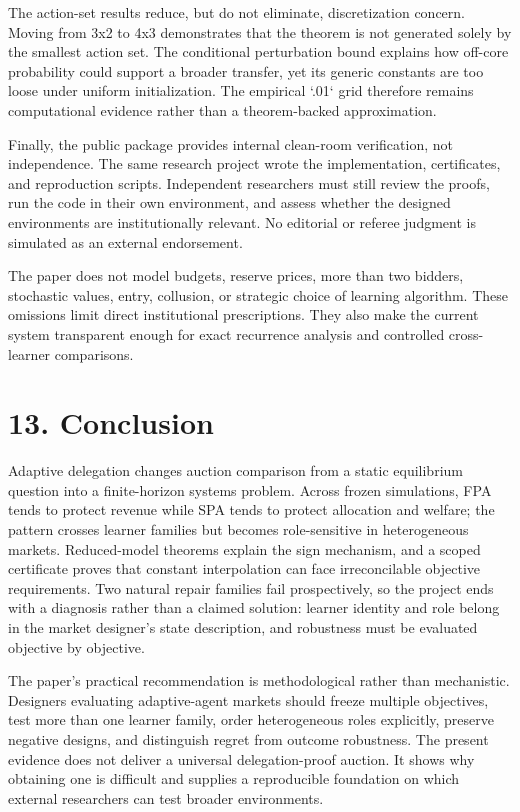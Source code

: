 \documentclass[11pt]{article}
\begin{document}
The action-set results reduce, but do not eliminate, discretization concern. Moving from 3x2 to 4x3 demonstrates that the theorem is not generated solely by the smallest action set. The conditional perturbation bound explains how off-core probability could support a broader transfer, yet its generic constants are too loose under uniform initialization. The empirical `.01` grid therefore remains computational evidence rather than a theorem-backed approximation.

Finally, the public package provides internal clean-room verification, not independence. The same research project wrote the implementation, certificates, and reproduction scripts. Independent researchers must still review the proofs, run the code in their own environment, and assess whether the designed environments are institutionally relevant. No editorial or referee judgment is simulated as an external endorsement.

The paper does not model budgets, reserve prices, more than two bidders, stochastic values, entry, collusion, or strategic choice of learning algorithm. These omissions limit direct institutional prescriptions. They also make the current system transparent enough for exact recurrence analysis and controlled cross-learner comparisons.

\section{13. Conclusion}
Adaptive delegation changes auction comparison from a static equilibrium question into a finite-horizon systems problem. Across frozen simulations, FPA tends to protect revenue while SPA tends to protect allocation and welfare; the pattern crosses learner families but becomes role-sensitive in heterogeneous markets. Reduced-model theorems explain the sign mechanism, and a scoped certificate proves that constant interpolation can face irreconcilable objective requirements. Two natural repair families fail prospectively, so the project ends with a diagnosis rather than a claimed solution: learner identity and role belong in the market designer's state description, and robustness must be evaluated objective by objective.

The paper's practical recommendation is methodological rather than mechanistic. Designers evaluating adaptive-agent markets should freeze multiple objectives, test more than one learner family, order heterogeneous roles explicitly, preserve negative designs, and distinguish regret from outcome robustness. The present evidence does not deliver a universal delegation-proof auction. It shows why obtaining one is difficult and supplies a reproducible foundation on which external researchers can test broader environments.
\end{document}
